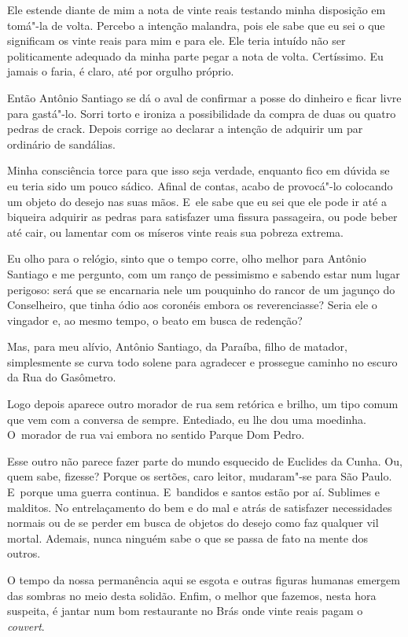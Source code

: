 Ele estende diante de mim a nota de vinte reais testando minha
disposição em tomá"-la de volta. Percebo a intenção malandra, pois ele
sabe que eu sei o que significam os vinte reais para mim e para ele. Ele
teria intuído não ser politicamente adequado da minha parte pegar a nota
de volta. Certíssimo. Eu jamais o faria, é claro, até por orgulho
próprio.

Então Antônio Santiago se dá o aval de confirmar a posse do dinheiro e
ficar livre para gastá"-lo. Sorri torto e ironiza a possibilidade da
compra de duas ou quatro pedras de crack. Depois corrige ao declarar a
intenção de adquirir um par ordinário de sandálias.

Minha consciência torce para que isso seja verdade, enquanto fico em
dúvida se eu teria sido um pouco sádico. Afinal de contas, acabo de
provocá"-lo colocando um objeto do desejo nas suas mãos. E~ele sabe que
eu sei que ele pode ir até a biqueira adquirir as pedras para satisfazer
uma fissura passageira, ou pode beber até cair, ou lamentar com os
míseros vinte reais sua pobreza extrema.

Eu olho para o relógio, sinto que o tempo corre, olho melhor para
Antônio Santiago e me pergunto, com um ranço de pessimismo e sabendo
estar num lugar perigoso: será que se encarnaria nele um pouquinho do
rancor de um jagunço do Conselheiro, que tinha ódio aos coronéis embora
os reverenciasse? Seria ele o vingador e, ao mesmo tempo, o beato em
busca de redenção?

Mas, para meu alívio, Antônio Santiago, da Paraíba, filho de matador,
simplesmente se curva todo solene para agradecer e prossegue caminho no
escuro da Rua do Gasômetro.

Logo depois aparece outro morador de rua sem retórica e brilho, um tipo
comum que vem com a conversa de sempre. Entediado, eu lhe dou uma
moedinha. O~morador de rua vai embora no sentido Parque Dom Pedro.

Esse outro não parece fazer parte do mundo esquecido de Euclides da
Cunha. Ou, quem sabe, fizesse? Porque os sertões, caro leitor,
mudaram"-se para São Paulo. E~porque uma guerra continua. E~bandidos e
santos estão por aí. Sublimes e malditos. No entrelaçamento do bem e do
mal e atrás de satisfazer necessidades normais ou de se perder em busca
de objetos do desejo como faz qualquer vil mortal. Ademais, nunca
ninguém sabe o que se passa de fato na mente dos outros.

O tempo da nossa permanência aqui se esgota e outras figuras humanas
emergem das sombras no meio desta solidão. Enfim, o melhor que fazemos,
nesta hora suspeita, é jantar num bom restaurante no Brás onde vinte
reais pagam o \emph{couvert}.

